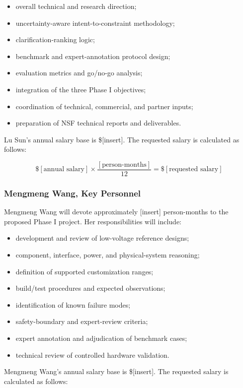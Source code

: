 \documentclass[11pt,letterpaper]{article}
\begin{document}
\begin{itemize}
    \item overall technical and research direction;
    \item uncertainty-aware intent-to-constraint methodology;
    \item clarification-ranking logic;
    \item benchmark and expert-annotation protocol design;
    \item evaluation metrics and go/no-go analysis;
    \item integration of the three Phase I objectives;
    \item coordination of technical, commercial, and partner inputs;
    \item preparation of NSF technical reports and deliverables.
\end{itemize}

Lu Sun's annual salary base is \$[insert]. The requested salary is calculated
as follows:

\[
\$[\text{annual salary}]
\times
\frac{[\text{person-months}]}{12}
=
\$[\text{requested salary}]
\]

\subsubsection*{Mengmeng Wang, Key Personnel}

Mengmeng Wang will devote approximately [insert] person-months to the proposed
Phase I project. Her responsibilities will include:

\begin{itemize}
    \item development and review of low-voltage reference designs;
    \item component, interface, power, and physical-system reasoning;
    \item definition of supported customization ranges;
    \item build/test procedures and expected observations;
    \item identification of known failure modes;
    \item safety-boundary and expert-review criteria;
    \item expert annotation and adjudication of benchmark cases;
    \item technical review of controlled hardware validation.
\end{itemize}

Mengmeng Wang's annual salary base is \$[insert]. The requested salary is
calculated as follows:
\end{document}
